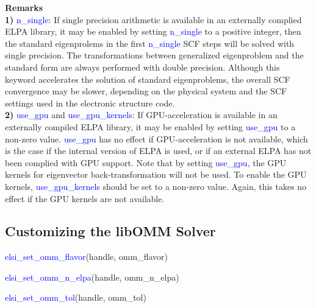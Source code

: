 \documentclass{report}
\begin{document}
\bigskip
\textbf{Remarks}\\

\textbf{1)} \textcolor{blue}{n\_single}:  If single precision arithmetic is available in an externally complied ELPA library, it may be enabled by setting \textcolor{blue}{n\_single} to a positive integer, then the standard eigenprolems in the first \textcolor{blue}{n\_single} SCF steps will be solved with single precision.  The transformations between generalized eigenproblem and the standard form are always performed with double precision.  Although this keyword accelerates the solution of standard eigenproblems, the overall SCF convergence may be slower, depending on the physical system and the SCF settings used in the electronic structure code.\\

\textbf{2)} \textcolor{blue}{use\_gpu} and \textcolor{blue}{use\_gpu\_kernels}:  If GPU-acceleration is available in an externally compiled ELPA library, it may be enabled by setting \textcolor{blue}{use\_gpu} to a non-zero value.  \textcolor{blue}{use\_gpu} has no effect if GPU-acceleration is not available, which is the case if the internal version of ELPA is used, or if an external ELPA has not been complied with GPU support.  Note that by setting \textcolor{blue}{use\_gpu}, the GPU kernels for eigenvector back-transformation will not be used.  To enable the GPU kernels, \textcolor{blue}{use\_gpu\_kernels} should be set to a non-zero value.  Again, this takes no effect if the GPU kernels are not available.\\

\subsection{Customizing the libOMM Solver}
\label{subsec:setter_omm}
\begin{labeling}{\hspace{6cm}}
\item [\hspace{0.3cm} \textcolor{blue}{elsi\_set\_omm\_flavor}(handle, omm\_flavor)]
\item [\hspace{0.3cm} \textcolor{blue}{elsi\_set\_omm\_n\_elpa}(handle, omm\_n\_elpa)]
\item [\hspace{0.3cm} \textcolor{blue}{elsi\_set\_omm\_tol}(handle, omm\_tol)]
\end{labeling}
\end{document}
